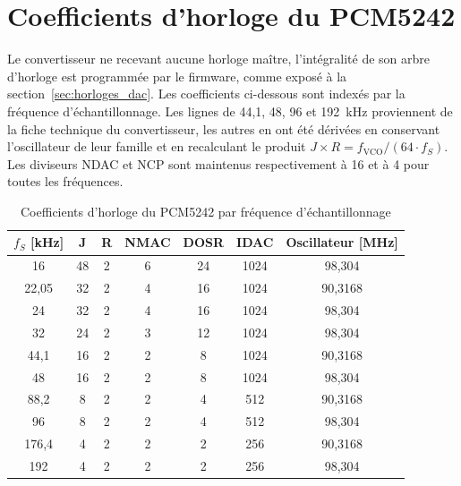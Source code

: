 \chapter{Coefficients d'horloge du PCM5242}
\label{ann:horloges}

Le convertisseur ne recevant aucune horloge maître, l'intégralité de son arbre d'horloge est programmée par le firmware, comme exposé à la section~\ref{sec:horloges_dac}. Les coefficients ci-dessous sont indexés par la fréquence d'échantillonnage. Les lignes de 44,1, 48, 96 et 192~kHz proviennent de la fiche technique du convertisseur, les autres en ont été dérivées en conservant l'oscillateur de leur famille et en recalculant le produit $J \times R = f_{\text{VCO}} / (64 \cdot f_S)$. Les diviseurs NDAC et NCP sont maintenus respectivement à 16 et à 4 pour toutes les fréquences.

\begin{table}[H]
    \centering
    \caption{Coefficients d'horloge du PCM5242 par fréquence d'échantillonnage}
    \label{tab:horloges_dac}
    \begin{tabular}{c c c c c c c}
        \hline
        $f_S$ [kHz] & J  & R & NMAC & DOSR & IDAC & Oscillateur [MHz] \\
        \hline
        16          & 48 & 2 & 6    & 24   & 1024 & 98,304            \\
        22,05       & 32 & 2 & 4    & 16   & 1024 & 90,3168           \\
        24          & 32 & 2 & 4    & 16   & 1024 & 98,304            \\
        32          & 24 & 2 & 3    & 12   & 1024 & 98,304            \\
        44,1        & 16 & 2 & 2    & 8    & 1024 & 90,3168           \\
        48          & 16 & 2 & 2    & 8    & 1024 & 98,304            \\
        88,2        & 8  & 2 & 2    & 4    & 512  & 90,3168           \\
        96          & 8  & 2 & 2    & 4    & 512  & 98,304            \\
        176,4       & 4  & 2 & 2    & 2    & 256  & 90,3168           \\
        192         & 4  & 2 & 2    & 2    & 256  & 98,304            \\
        \hline
    \end{tabular}
\end{table}
